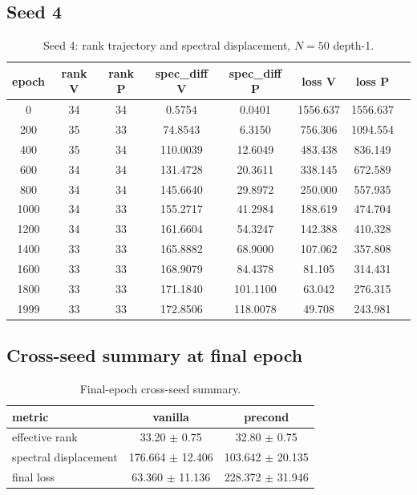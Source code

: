 \subsection*{Seed 4}
\begin{table}[H]
\centering
\caption{Seed 4: rank trajectory and spectral displacement, $N = 50$ depth-1.}
\label{tab:ranspec-s4}
\begin{tabular}{c c c c c c c c}
\toprule
epoch & rank V & rank P & spec\_diff V & spec\_diff P & loss V & loss P \\
\midrule
0 & 34 & 34 & 0.5754 & 0.0401 & 1556.637 & 1556.637 \\
200 & 35 & 33 & 74.8543 & 6.3150 & 756.306 & 1094.554 \\
400 & 35 & 34 & 110.0039 & 12.6049 & 483.438 & 836.149 \\
600 & 34 & 34 & 131.4728 & 20.3611 & 338.145 & 672.589 \\
800 & 34 & 34 & 145.6640 & 29.8972 & 250.000 & 557.935 \\
1000 & 34 & 33 & 155.2717 & 41.2984 & 188.619 & 474.704 \\
1200 & 34 & 33 & 161.6604 & 54.3247 & 142.388 & 410.328 \\
1400 & 33 & 33 & 165.8882 & 68.9000 & 107.062 & 357.808 \\
1600 & 33 & 33 & 168.9079 & 84.4378 & 81.105 & 314.431 \\
1800 & 33 & 33 & 171.1840 & 101.1100 & 63.042 & 276.315 \\
1999 & 33 & 33 & 172.8506 & 118.0078 & 49.708 & 243.981 \\
\bottomrule
\end{tabular}
\end{table}

\subsection*{Cross-seed summary at final epoch}
\begin{table}[H]
\centering
\caption{Final-epoch cross-seed summary.}
\label{tab:ranspec-summary}
\begin{tabular}{l c c}
\toprule
metric & vanilla & precond \\
\midrule
effective rank & 33.20 $\pm$ 0.75 & 32.80 $\pm$ 0.75 \\
spectral displacement & 176.664 $\pm$ 12.406 & 103.642 $\pm$ 20.135 \\
final loss & 63.360 $\pm$ 11.136 & 228.372 $\pm$ 31.946 \\
\bottomrule
\end{tabular}
\end{table}
